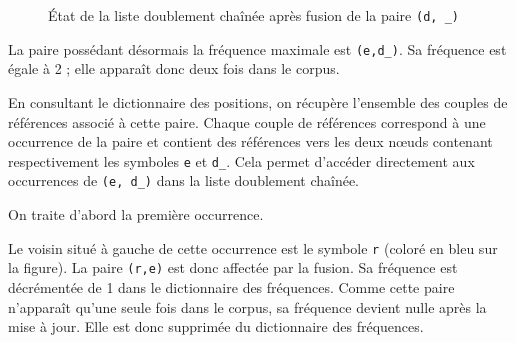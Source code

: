 \documentclass[12pt,a4paper]{report}
\begin{document}
\begin{figure}[h]
		\caption{État de la liste doublement chaînée après fusion de la paire \texttt{(d, \_)}}
		\label{fig:corpus_bpe1}
		
		\end{figure}

	La paire possédant désormais la fréquence maximale est \texttt{(e,d\_)}. Sa fréquence est égale à 2 ; elle apparaît donc deux fois dans le corpus.
	
	En consultant le dictionnaire des positions, on récupère l’ensemble des couples de références associé à cette paire. Chaque couple de références correspond à une occurrence de la paire et contient des références vers les deux nœuds contenant respectivement les symboles \texttt{e} et \texttt{d\_}. Cela permet d’accéder directement aux occurrences de \texttt{(e, d\_)} dans la liste doublement chaînée.
	
	On traite d’abord la première occurrence.
	
	Le voisin situé à gauche de cette occurrence est le symbole \texttt{r} (coloré en bleu sur la figure). La paire \texttt{(r,e)} est donc affectée par la fusion. Sa fréquence est décrémentée de 1 dans le dictionnaire des fréquences. Comme cette paire n’apparaît qu’une seule fois dans le corpus, sa fréquence devient nulle après la mise à jour. Elle est donc supprimée du dictionnaire des fréquences.
	
\end{document}
